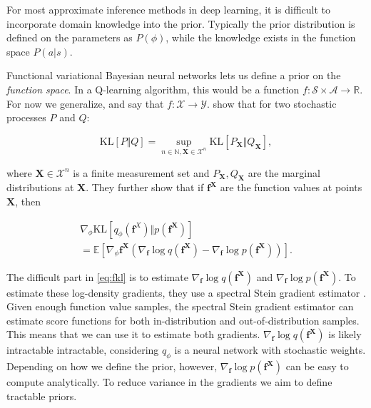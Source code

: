 \documentclass[]{uai2021} %
\newcommand{\defeq}{\vcentcolon=}
\newcommand{\R}{\mathbb{R}}
\newcommand{\E}{\mathbb{E}}
\newcommand{\N}{\mathbb{N}}
\newcommand{\D}{\mathcal{D}}
\newcommand{\B}{\mathcal{B}}
\newcommand{\X}{\mathbf{X}}
\newcommand{\f}{\mathbf{f}}
\newcommand{\state}{\mathcal{S}}
\newcommand{\action}{\mathcal{A}}
\newcommand{\KL}{\mathrm{KL}}
\begin{document}
For most approximate inference methods in deep learning, it is difficult to incorporate domain
knowledge into the prior. Typically the prior distribution is defined on the parameters as \(P(\phi)\),
while the knowledge exists in the function space \(P(a \vert s)\).

Functional variational Bayesian neural networks \citep{sun_functional_2019} lets us define a prior on the
\emph{function space}. In a Q-learning algorithm, this would be a function
\(f : \state \times \action \rightarrow \R\). For now we generalize, and say that
\(f : \mathcal{X} \rightarrow \mathcal{Y}\).
\citet{sun_functional_2019} show that for two stochastic processes \(P\) and \(Q\):

\begin{equation}
    \KL[P \Vert Q] = \sup_{n \in \N, \X \in \mathcal{X}^n} \KL \left[ P_\X \Vert Q_\X \right],
\end{equation}

where \(\X \in \mathcal{X}^n\) is a finite measurement set and \(P_\X, Q_\X\) are the marginal distributions
at \(\X\). They further show that if \(\f^\X\) are the function values at points \(\X\), then

\begin{multline}\label{eq:fkl}
    \nabla_\phi \KL[q_\phi(\f^X) \Vert p(\f^\X)] \\
    = \E \left[ \nabla_\phi \f^\X( \nabla_\f \log q(\f^\X) - \nabla_\f \log p(\f^\X)) \right].
\end{multline}

The difficult part in \eqref{eq:fkl} is to estimate \(\nabla_\f \log q(\f^\X)\) and \(\nabla_\f \log p(\f^\X)\).
To estimate these log-density gradients, they use a spectral Stein gradient estimator \citep{shi_spectral_2018}.
Given enough function value samples, the spectral Stein gradient estimator can estimate score functions
for both in-distribution and out-of-distribution samples. This means that we can use it to estimate
both gradients. \(\nabla_\f \log q(\f^\X)\) is likely intractable intractable, considering \(q_\phi\) is
a neural network with stochastic weights. Depending on how we define the prior, however, \(\nabla_\f \log p(\f^\X)\)
can be easy to compute analytically. To reduce variance in the gradients we aim to define tractable priors.

\end{document}

